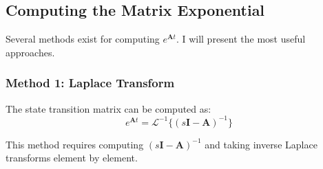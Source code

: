 \subsection{Computing the Matrix Exponential}

Several methods exist for computing $e^{\mathbf{A}t}$. I will present the most useful approaches.

\subsubsection{Method 1: Laplace Transform}

The state transition matrix can be computed as:
\begin{equation}
e^{\mathbf{A}t} = \mathcal{L}^{-1}\{(s\mathbf{I} - \mathbf{A})^{-1}\}
\label{eq:exp_laplace}
\end{equation}

This method requires computing $(s\mathbf{I} - \mathbf{A})^{-1}$ and taking inverse Laplace transforms element by element.

